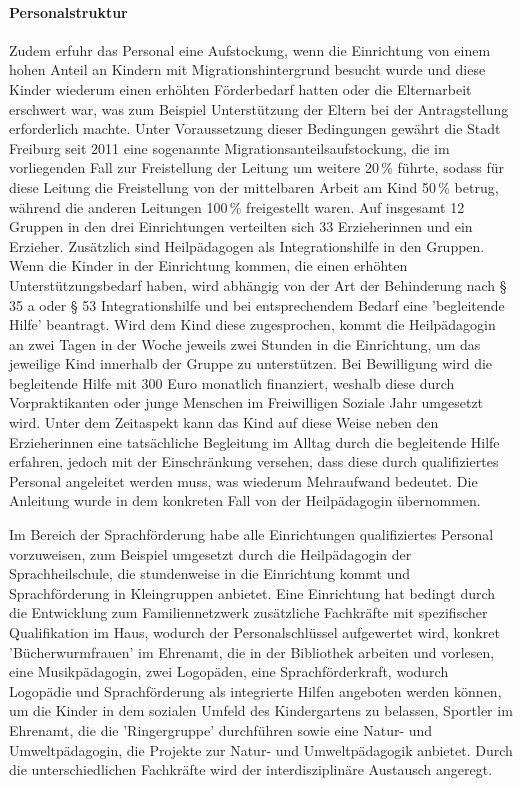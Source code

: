 \paragraph{Personalstruktur}
Zudem erfuhr das Personal eine Aufstockung, wenn die Einrichtung von einem hohen Anteil an Kindern mit Migrationshintergrund besucht wurde und diese Kinder wiederum einen erhöhten Förderbedarf hatten oder die Elternarbeit erschwert war, was zum Beispiel Unterstützung der Eltern bei der Antragstellung erforderlich machte. Unter Voraussetzung dieser Bedingungen gewährt die Stadt Freiburg seit 2011 eine sogenannte Migrationsanteilsaufstockung, die im vorliegenden Fall zur Freistellung der Leitung um weitere 20\,\% führte, sodass für diese Leitung die Freistellung von der mittelbaren Arbeit am Kind 50\,\% betrug, während die anderen Leitungen 100\,\% freigestellt waren. 
Auf insgesamt 12 Gruppen in den drei Einrichtungen verteilten sich 33 Erzieherinnen und ein Erzieher. Zusätzlich sind Heilpädagogen als Integrationshilfe in den Gruppen. Wenn die Kinder in der Einrichtung kommen, die einen erhöhten Unterstützungsbedarf haben, wird abhängig von der Art der Behinderung nach § 35 a oder § 53 Integrationshilfe und bei entsprechendem Bedarf eine 'begleitende Hilfe' beantragt. Wird dem Kind diese zugesprochen, kommt die Heilpädagogin an zwei Tagen in der Woche jeweils zwei Stunden in die Einrichtung, um das jeweilige Kind innerhalb der Gruppe zu unterstützen. Bei Bewilligung wird die begleitende Hilfe mit 300 Euro monatlich finanziert, weshalb diese durch Vorpraktikanten oder junge Menschen im Freiwilligen Soziale Jahr umgesetzt wird. Unter dem Zeitaspekt kann das Kind auf diese Weise neben den Erzieherinnen eine tatsächliche Begleitung im Alltag durch die begleitende Hilfe erfahren, jedoch mit der Einschränkung versehen, dass diese durch qualifiziertes Personal angeleitet werden muss, was wiederum Mehraufwand bedeutet. Die Anleitung wurde in dem konkreten Fall von der Heilpädagogin übernommen. 

Im Bereich der Sprachförderung habe alle Einrichtungen qualifiziertes Personal vorzuweisen, zum Beispiel umgesetzt durch die Heilpädagogin der Sprachheilschule, die stundenweise in die Einrichtung kommt und Sprachförderung in Kleingruppen anbietet. Eine Einrichtung hat bedingt durch die Entwicklung zum Familiennetzwerk zusätzliche Fachkräfte mit spezifischer Qualifikation im Haus, wodurch der Personalschlüssel aufgewertet wird, konkret 'Bücherwurmfrauen' im Ehrenamt, die in der Bibliothek arbeiten und vorlesen, eine Musikpädagogin, zwei Logopäden, eine Sprachförderkraft, wodurch Logopädie und Sprachförderung als integrierte Hilfen angeboten werden können, um die Kinder in dem sozialen Umfeld des Kindergartens zu belassen, Sportler im Ehrenamt, die die 'Ringergruppe' durchführen sowie eine Natur- und Umweltpädagogin, die Projekte zur Natur- und Umweltpädagogik anbietet. Durch die unterschiedlichen Fachkräfte wird der interdisziplinäre Austausch angeregt. 

